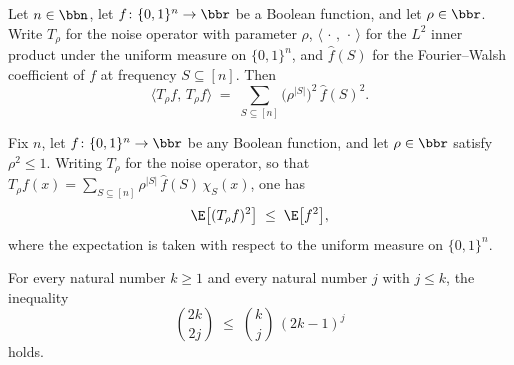 \begin{lemma}
\label{BooleanAnalysis.Hypercontractivity.noise_l2_fourier}
\leanok
{}
Let $n\in\bbn$, let $f\colon\{0,1\}^n\to\bbr$ be a Boolean function, and let
$\rho\in\bbr$. Write $T_\rho$ for the noise operator with parameter $\rho$,
$\langle\,\cdot\,,\,\cdot\,\rangle$ for the $L^2$ inner product under the uniform
measure on $\{0,1\}^n$, and $\hat f(S)$ for the Fourier--Walsh coefficient of $f$ at
frequency $S\subseteq[n]$. Then
\[
  \langle T_\rho f,\, T_\rho f\rangle
  \;=\; \sum_{S\subseteq[n]} \bigl(\rho^{|S|}\bigr)^2\,\hat f(S)^2 .
\]
\end{lemma}

\begin{theorem}
\label{BooleanAnalysis.Hypercontractivity.contractivity}
\leanok
{}
Fix $n$, let $f\colon\{0,1\}^n\to\bbr$ be any Boolean function, and let $\rho\in\bbr$
satisfy $\rho^2\le 1$. Writing $T_\rho$ for the noise operator, so that $T_\rho
f(x)=\sum_{S\subseteq[n]}\rho^{|S|}\,\hat f(S)\,\chi_S(x)$, one has
\[
  \E\big[(T_\rho f)^2\big]\;\le\;\E\big[f^2\big],
\]
where the expectation is taken with respect to the uniform measure on $\{0,1\}^n$.
\end{theorem}

\begin{lemma}
\label{BooleanAnalysis.Hypercontractivity.binom_coeff_ineq}
\leanok
{}
For every natural number $k \ge 1$ and every natural number $j$ with $j \le k$, the
inequality
\[
  \binom{2k}{2j} \;\le\; \binom{k}{j}\,(2k-1)^{j}
\]
holds.
\end{lemma}

